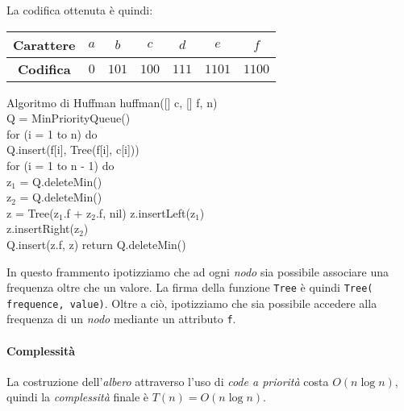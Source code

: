 \noindent
La codifica ottenuta è quindi:
\begin{table}[h!]
    \centering
    \renewcommand{\arraystretch}{1.2}
    \begin{tabular}{|c|c|c|c|c|c|c|}
        \hline
        \textbf{Carattere} & $a$ & $b$ & $c$ & $d$ & $e$ & $f$\\
        \hline
        \textbf{Codifica} & $0$ & $101$ & $100$ & $111$ & $1101$ &  $1100$\\
        \hline
    \end{tabular}
\end{table}

\newpage
\begin{minicode}{Algoritmo di Huffman}
\ind{} huffman([] c, [] f,  n)\\
     Q = MinPriorityQueue()\\
    \indf for (i = 1 to n) do\\
        Q.insert(f[i], Tree(f[i], c[i]))\\
    \indf for (i = 1 to n - 1) do\\
        z$_1$ = Q.deleteMin()\\
        z$_2$ = Q.deleteMin()\\
        z = Tree(z$_1$.f + z$_2$.f, nil)\hfill{}
        z.insertLeft(z$_1$)\\
        z.insertRight(z$_2$)\\
        Q.insert(z.f, z)\hfill{}
    \indf return Q.deleteMin()
\end{minicode}
\begin{note}
    In questo frammento ipotizziamo che ad ogni \emph{nodo} sia possibile
    associare una frequenza oltre che un valore. La firma della funzione
    \texttt{Tree} è quindi \texttt{Tree( frequence,  value)}.
    Oltre a ciò, ipotizziamo che sia possibile accedere alla frequenza di un
    \emph{nodo} mediante un attributo \texttt{f}.
\end{note}

\paragraph{Complessità}
La costruzione dell'\emph{albero} attraverso l'uso di \emph{code a priorità}
costa $O(n\log n)$, quindi la \emph{complessità} finale è $T(n)=O(n\log n)$.

